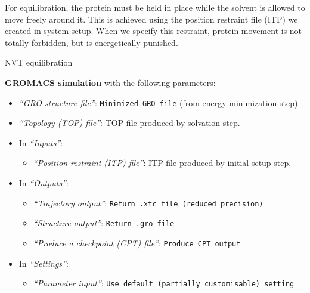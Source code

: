 \documentclass[twocolumn]{bmcart}%
\providecommand{\tightlist}{%
  \setlength{\itemsep}{0pt}\setlength{\parskip}{0pt}}
\begin{document}
For equilibration, the protein must be held in place while the solvent is allowed to move freely around it. This is achieved using the position restraint file (ITP) we created in system setup. When we specify this restraint, protein movement is not totally forbidden, but is energetically punished.

\begin{handson_box_colour}{NVT
equilibration}


  \textbf{GROMACS simulation} with the following parameters:

  \begin{itemize}
  \tightlist
  \item
    \emph{``GRO structure file''}: \texttt{Minimized\ GRO\ file} (from
    energy minimization step)
  \item
    \emph{``Topology (TOP) file''}: TOP file produced by solvation step.
  \item
    In \emph{``Inputs''}:

    \begin{itemize}
    \tightlist
    \item
      \emph{``Position restraint (ITP) file''}: ITP file produced by
      initial setup step.
    \end{itemize}
  \item
    In \emph{``Outputs''}:

    \begin{itemize}
    \tightlist
    \item
      \emph{``Trajectory output''}:
      \texttt{Return\ .xtc\ file\ (reduced\ precision)}
    \item
      \emph{``Structure output''}: \texttt{Return\ .gro\ file}
    \item
      \emph{``Produce a checkpoint (CPT) file''}:
      \texttt{Produce\ CPT\ output}
    \end{itemize}
  \item
    In \emph{``Settings''}:

    \begin{itemize}
    \tightlist
    \item
      \emph{``Parameter input''}:
      \texttt{Use\ default\ (partially\ customisable)\ setting}


\end{itemize}
\end{itemize}
\end{handson_box_colour}
\end{document}
